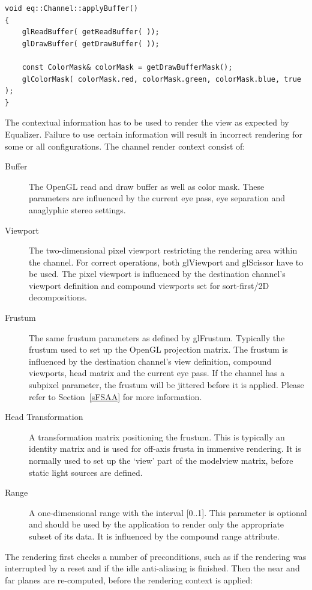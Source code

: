 \documentclass[10pt,a4]{scrartcl}
\newcommand{\sref}[1]{Section~\ref{#1}}
\begin{document}
{\footnotesize\begin{lstlisting}
void eq::Channel::applyBuffer()
{
    glReadBuffer( getReadBuffer( ));
    glDrawBuffer( getDrawBuffer( ));
    
    const ColorMask& colorMask = getDrawBufferMask();
    glColorMask( colorMask.red, colorMask.green, colorMask.blue, true );
}
\end{lstlisting}}

The contextual information has to be used to render the view as
expected by Equalizer. Failure to use certain information will result in
incorrect rendering for some or all configurations. The channel render
context consist of:

\begin{description}
\item[Buffer] The OpenGL read and draw buffer as well as color mask.
  These parameters are influenced by the current eye pass, eye
  separation and anaglyphic stereo settings.
\item[Viewport] The two-dimensional pixel viewport restricting the
  rendering area within the channel. For correct operations, both
  \textsf{glViewport} and \textsf{glScissor} have to be used. The pixel
  viewport is influenced by the destination channel's viewport
  definition and compound viewports set for sort-first/2D decompositions.
\item[Frustum] The same frustum parameters as defined by
  \textsf{glFrustum}. Typically the frustum used to set up the OpenGL projection
  matrix. The frustum is influenced by the destination channel's view
  definition, compound viewports, head matrix and the current eye pass. If the
  channel has a subpixel parameter, the frustum will be jittered before it is
  applied. Please refer to \sref{sFSAA} for more information.
\item[Head Transformation] A transformation matrix positioning the
  frustum. This is typically an identity matrix and is used for off-axis
  frusta in immersive rendering. It is normally used to set up the
  `view' part of the modelview matrix, before static light sources are
  defined.
\item[Range] A one-dimensional range with the interval [0..1]. This
  parameter is optional and should be used by the application to render
  only the appropriate subset of its data. It is influenced by the
  compound range attribute.
\end{description}

The rendering first checks a number of preconditions, such as if the rendering
was interrupted by a reset and if the idle anti-aliasing is finished. Then the
near and far planes are re-computed, before the rendering context is applied:
\end{document}
